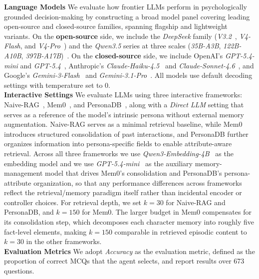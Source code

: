 \documentclass{article}
\begin{document}
\textbf{Language Models}
We evaluate how frontier LLMs perform in psychologically grounded decision-making by constructing a broad model panel covering leading open-source and closed-source families, spanning flagship and lightweight variants. On the \textbf{open-source} side, we include the \textit{DeepSeek} family (\textit{V3.2}~\cite{deepseek_v3_2_2025}, \textit{V4-Flash}, and \textit{V4-Pro}~\cite{deepseek_v4_2026}) and the \textit{Qwen3.5} series at three scales (\textit{35B-A3B}, \textit{122B-A10B}, \textit{397B-A17B})~\cite{qwen35_2026}. On the \textbf{closed-source} side, we include OpenAI's \textit{GPT-5.4-mini} and \textit{GPT-5.4}~\cite{openai2026gpt54}, Anthropic's \textit{Claude-Haiku-4.5}~\cite{anthropic2025haiku45} and \textit{Claude-Sonnet-4.6}~\cite{anthropic2026sonnet46}, and Google's \textit{Gemini-3-Flash}~\cite{google2025gemini3flash} and \textit{Gemini-3.1-Pro}~\cite{google2026gemini31pro}. All models use default decoding settings with temperature set to 0.\\
\textbf{Interactive Settings}
We evaluate LLMs using three interactive frameworks: Naive-RAG~\cite{lewis2020retrieval}, Mem0~\cite{chhikara2025mem0}, and PersonaDB~\cite{sun2025persona}, along with a \textit{Direct LLM} setting that serves as a reference of the model’s intrinsic persona without external memory augmentation. Naive-RAG serves as a minimal retrieval baseline, while Mem0 introduces structured consolidation of past interactions, and PersonaDB further organizes information into persona-specific fields to enable attribute-aware retrieval. Across all three frameworks we use \textit{Qwen3-Embedding-4B}~\cite{qwen3embedding} as the embedding model and we use \textit{GPT-5.4-mini}~\cite{openai2026gpt54} as the auxiliary memory-management model that drives Mem0's consolidation and PersonaDB's persona-attribute organization, so that any performance differences across frameworks reflect the retrieval/memory paradigm itself rather than incidental encoder or controller choices. For retrieval depth, we set $k{=}30$ for Naive-RAG and PersonaDB, and $k{=}150$ for Mem0. The larger budget in Mem0 compensates for its consolidation step, which decomposes each character memory into roughly five fact-level elements, making $k{=}150$ comparable in retrieved episodic content to $k{=}30$ in the other frameworks.\\
\textbf{Evaluation Metrics}
We adopt \textit{Accuracy} as the evaluation metric, defined as the proportion of correct MCQs that the agent selects, and report results over 673 questions.
\end{document}
